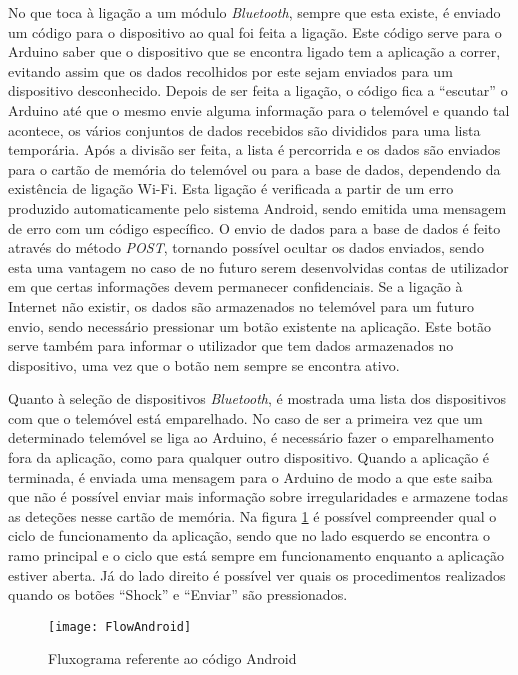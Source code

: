 No que toca à ligação a um módulo \emph{Bluetooth}, sempre que esta existe, é enviado um código para o dispositivo ao qual foi feita a ligação.
Este código serve para o Arduino saber que o dispositivo que se encontra ligado tem a aplicação a correr, evitando assim que os dados recolhidos por este sejam enviados para um dispositivo desconhecido.
Depois de ser feita a ligação, o código fica a ``escutar'' o Arduino até que o mesmo envie alguma informação para o telemóvel e quando tal acontece, os vários conjuntos de dados  recebidos são divididos para uma lista temporária.
Após a divisão ser feita, a lista é percorrida e os dados são enviados para o cartão de memória do telemóvel ou para a base de dados, dependendo da existência de ligação Wi-Fi.
Esta ligação é verificada a partir de um erro produzido automaticamente pelo sistema Android, sendo emitida uma mensagem de erro com um código específico.
O envio de dados para a base de dados é feito através do método \emph{POST}, tornando possível ocultar os dados enviados, sendo esta uma vantagem no caso de no futuro serem desenvolvidas contas de utilizador em que certas informações devem permanecer confidenciais.
Se a ligação à Internet não existir, os dados são armazenados no telemóvel para um futuro envio, sendo necessário pressionar um botão existente na aplicação.
Este botão serve também para informar o utilizador que tem dados armazenados no dispositivo, uma vez que o botão nem sempre se encontra ativo.

Quanto à seleção de dispositivos \emph{Bluetooth}, é mostrada uma lista dos dispositivos com que o telemóvel está emparelhado.
No caso de ser a primeira vez que um determinado telemóvel se liga ao Arduino, é necessário fazer o emparelhamento fora da aplicação, como para qualquer outro dispositivo.
Quando a aplicação é terminada, é enviada uma mensagem para o Arduino de modo a que este saiba que não é possível enviar mais informação sobre irregularidades e armazene todas as deteções nesse cartão de memória.
Na figura \ref{fig:Fluxograma_referente_ao_código_android} é possível compreender qual o ciclo de funcionamento da aplicação, sendo que no lado esquerdo se encontra o ramo principal e o ciclo que está sempre em funcionamento enquanto a aplicação estiver aberta.
Já do lado direito é possível ver quais os procedimentos realizados quando os botões ``Shock'' e ``Enviar'' são pressionados.

\begin{figure}[hbtp]
	\centering
	\texttt{[image: FlowAndroid]}
	\caption{Fluxograma referente ao código Android}
	\label{fig:Fluxograma_referente_ao_código_android}
\end{figure}

